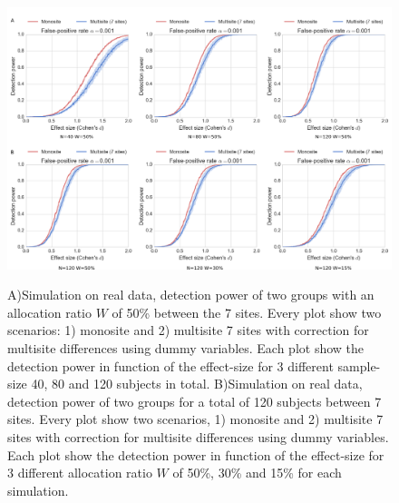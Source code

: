\documentclass[authoryear]{elsarticle}
\begin{document}
\begin{figure}[tbp]
\centering
\captionsetup[subfloat]{labelformat=empty}
{\includegraphics[width=\textwidth]{../figures/simulations_real_7sites.png}}

\caption{
A)Simulation on real data, detection power of two groups with an allocation ratio $W$ of 50\% between the 7 sites. Every plot show two scenarios: 1) monosite and 2) multisite 7 sites with correction for multisite differences using dummy variables. Each plot show the detection power in function of the effect-size for 3 different sample-size 40, 80 and 120 subjects in total.
B)Simulation on real data, detection power of two groups for a total of 120 subjects between 7 sites. Every plot show two scenarios, 1) monosite and 2) multisite 7 sites with correction for multisite differences using dummy variables. Each plot show the detection power in function of the effect-size for 3 different allocation ratio $W$ of 50\%, 30\% and 15\% for each simulation.
}
\label{fig_real_sim}
\end{figure}
\end{document}
